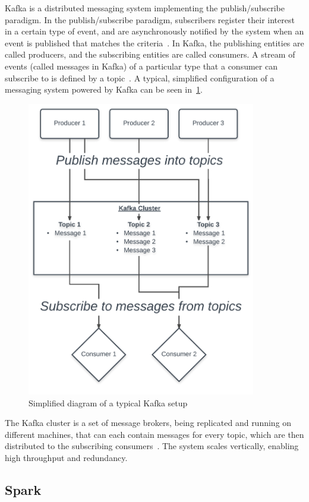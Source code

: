 Kafka is a distributed messaging system implementing the publish/subscribe paradigm.
In the publish/subscribe paradigm, subscribers register their interest in a certain type of event,
and are asynchronously notified by the system when an event is published that matches the criteria~\cite{Eugster2003}.
In Kafka, the publishing entities are called producers, and the subscribing entities are called consumers.
A stream of events (called messages in Kafka) of a particular type that a consumer can subscribe to is defined by a topic~\cite{Kreps2015}.
A typical, simplified configuration of a messaging system powered by Kafka can be seen in~\cref{fig:kafka}.
\begin{figure}
    \centering
    \caption{Simplified diagram of a typical Kafka setup}
    \label{fig:kafka}
    \includegraphics[width=10cm]{../figures/kafka.pdf}
\end{figure}

The Kafka cluster is a set of message brokers, being replicated and running on different machines, that can each contain messages for every topic,
which are then distributed to the subscribing consumers~\cite{Kreps2015}.
The system scales vertically, enabling high throughput and redundancy.

\subsection{Spark}
\label{subsec:spark}

